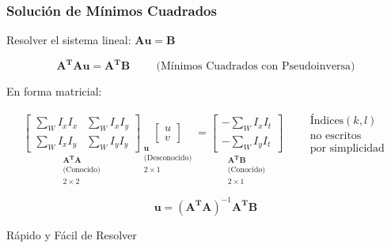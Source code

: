 \begin{frame}
  \frametitle{Solución de Mínimos Cuadrados}

  Resolver el sistema lineal: \quad $\mathbf{A u = B}$

  \begin{equation*}
  \mathbf{A^T A u = A^T B} \hspace{1cm} \text{(Mínimos Cuadrados con Pseudoinversa)}
  \end{equation*}

  En forma matricial:

  \begin{equation*}
  \underset{\substack{\mathbf{A^T A} \\ \text{(Conocido)} \\2\times2}}{
    \boxed{
    \begin{bmatrix}
    \sum_W I_x I_x & \sum_W I_x I_y \\
    \sum_W I_x I_y & \sum_W I_y I_y
    \end{bmatrix}
    }
  }
  \underset{\substack{\mathbf{u} \\ \text{(Desconocido)}\\ 2\times1}}{
    \boxed{
      \begin{bmatrix}
      u \\ v
      \end{bmatrix}
    }
  }
  =
  \underset{\substack{\mathbf{A^T B} \\\text{(Conocido)} \\ 2\times1}}{
    \boxed{
      \begin{bmatrix}
      -\sum_W I_x I_t \\ -\sum_W I_y I_t
      \end{bmatrix}
    }
  }
  \qquad \substack{\text{Índices} (k,l)\\ \text{no escritos}\\ \text{por simplicidad}}
  \end{equation*}

  \begin{equation*}
  \boxed{\mathbf{u} = (\mathbf{A^T A})^{-1}\mathbf{A^T B}}
  \end{equation*}

  Rápido y Fácil de Resolver

\end{frame}


